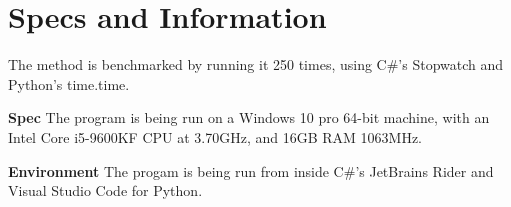 \section{Specs and Information}
The method is benchmarked by running it 250 times, using C\#'s Stopwatch and Python's time.time.

\noindent\textbf{Spec} \hspace{4px} The program is being run on a Windows 10 pro 64-bit machine, with an Intel Core i5-9600KF CPU at 3.70GHz, and 16GB RAM 1063MHz.


\noindent\textbf{Environment} \hspace{4px} The progam is being run from inside C\#'s JetBrains Rider and Visual Studio Code for Python.